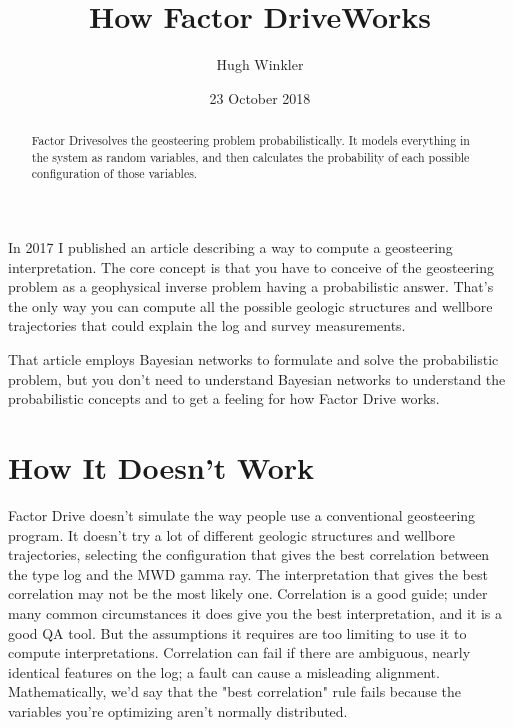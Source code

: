 \documentclass{tufte-handout}
\title{How Factor Drive\texttrademark Works}
\author[Hugh Winkler]{Hugh Winkler}
\date{23 October 2018}  %
\begin{document}
\maketitle%

\begin{abstract}
\noindent
Factor Drive\texttrademark solves the geosteering problem probabilistically.
It models everything in the system as random variables, and then  
calculates the probability of each possible configuration of those variables.
\end{abstract}


In 2017 I published an article\cite{Winkler2017}  describing a way to
compute a geosteering interpretation. The core concept is that
you have to conceive of the geosteering problem as a geophysical inverse 
problem having a probabilistic answer. That's the only way you can compute all the
possible geologic structures and wellbore trajectories that could explain the log
and survey measurements.

That article employs Bayesian networks to formulate and solve the probabilistic problem, but you
don't need to understand Bayesian networks to understand the probabilistic concepts and to get
a feeling for how Factor Drive works. 

\section{How It Doesn't Work}\label{sec:how-it-doesnt-work}
Factor Drive doesn't simulate the way people use a conventional geosteering program.
It doesn't try a lot of different geologic structures and wellbore trajectories, selecting
the configuration that gives the best correlation between the type log and the MWD gamma ray. The
interpretation that gives the best correlation may not be the most likely one.
Correlation is a good guide; under many common circumstances it does give you the best
interpretation, and it is a good QA tool. But the assumptions it requires are too limiting to use it to compute interpretations.
Correlation can fail if there are ambiguous, nearly identical features on the log; a fault can cause a misleading alignment. Mathematically, we'd say that the "best correlation" rule fails because the variables you're optimizing aren't normally distributed.
\end{document}
